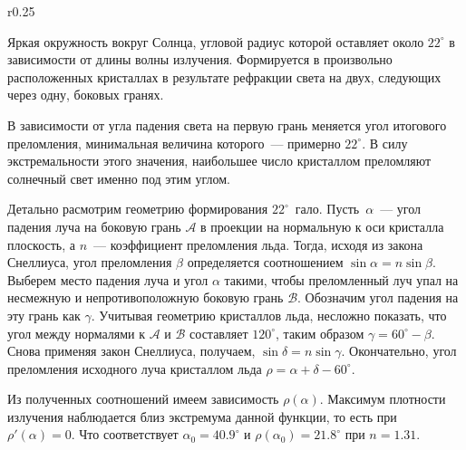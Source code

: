 \begin{wrapfigure}[11]{r}{0.25\tw}
	\caption{}
	\label{}
\end{wrapfigure}
Яркая окружность вокруг Солнца, угловой радиус которой оставляет около $22^\circ$ в зависимости от длины волны излучения. Формируется в произвольно расположенных кристаллах в результате рефракции света на двух, следующих через одну, боковых гранях.

В зависимости от угла падения света на первую грань меняется угол итогового преломления, минимальная величина которого~--- примерно $22^\circ$. В силу экстремальности этого значения, наибольшее число кристаллом преломляют солнечный свет именно под этим углом.

Детально расмотрим геометрию формирования $22^\circ$~гало. Пусть~$\alpha$~--- угол падения луча на боковую грань $\mathcal{A}$ в проекции на нормальную к оси кристалла плоскость, а $n$~--- коэффициент преломления льда. Тогда, исходя из закона Снеллиуса, угол преломления $\beta$ определяется соотношением $\sin \alpha = n \sin \beta$. Выберем место падения луча и угол $\alpha$ такими, чтобы преломленный луч упал на несмежную и непротивоположную боковую грань $\mathcal{B}$. Обозначим угол падения на эту грань как $\gamma$. Учитывая геометрию кристаллов льда, несложно показать, что угол между нормалями к $\mathcal{A}$ и $\mathcal{B}$ составляет $120^\circ$, таким образом $\gamma = 60^\circ - \beta$. Снова применяя закон Снеллиуса, получаем, $\sin \delta = n \sin \gamma$. Окончательно, угол преломления исходного луча кристаллом льда $\rho =  \alpha + \delta - 60^\circ$.

Из полученных соотношений имеем зависимость $\rho(\alpha)$. Максимум плотности излучения наблюдается близ экстремума данной функции, то есть при $\rho'(\alpha) = 0$. Что соответствует $\alpha_0 = 40.9^\circ$ и $\rho(\alpha_0) = 21.8^\circ$ при $n=1.31$.